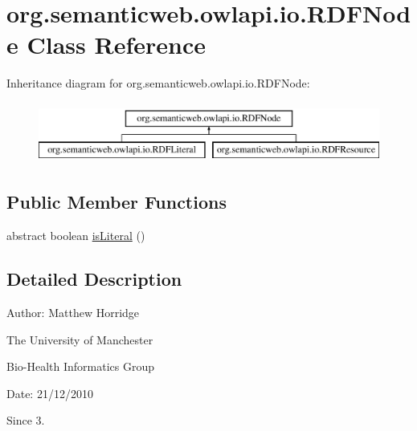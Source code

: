 \hypertarget{classorg_1_1semanticweb_1_1owlapi_1_1io_1_1_r_d_f_node}{\section{org.\-semanticweb.\-owlapi.\-io.\-R\-D\-F\-Node Class Reference}
\label{classorg_1_1semanticweb_1_1owlapi_1_1io_1_1_r_d_f_node}
}
Inheritance diagram for org.\-semanticweb.\-owlapi.\-io.\-R\-D\-F\-Node\-:\begin{figure}[H]
\begin{center}
\leavevmode
\includegraphics[height=2.000000cm]{classorg_1_1semanticweb_1_1owlapi_1_1io_1_1_r_d_f_node}
\end{center}
\end{figure}
\subsection*{Public Member Functions}
\begin{DoxyCompactItemize}
\item 
abstract boolean \hyperlink{classorg_1_1semanticweb_1_1owlapi_1_1io_1_1_r_d_f_node_a606514b47c60bb777eba6bf9c14b64a0}{is\-Literal} ()
\end{DoxyCompactItemize}


\subsection{Detailed Description}
Author\-: Matthew Horridge\par
 The University of Manchester\par
 Bio-\/\-Health Informatics Group\par
 Date\-: 21/12/2010 \begin{DoxySince}{Since}
3. 
\end{DoxySince}


